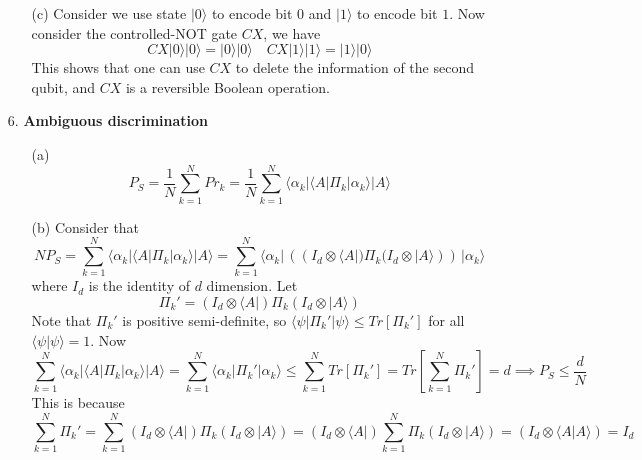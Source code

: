 \begin{enumerate}
\begin{enumerate}
    \item [(c)] Consider we use state $|0\rangle$ to encode bit $0$ and $|1\rangle$ to encode bit $1$. Now consider the controlled-NOT gate $CX$, we have
    \[
    CX |0\rangle |0\rangle = |0\rangle |0\rangle \quad CX |1\rangle |1\rangle = |1\rangle |0\rangle
    \]
    This shows that one can use $CX$ to delete the information of the second qubit, and $CX$ is a reversible Boolean operation.
\end{enumerate}


\item[6.] \textbf{Ambiguous discrimination}

\begin{enumerate}
    \item [(a)]
    \[
    P_S = \frac{1}{N} \sum_{k=1}^N Pr_k = \frac{1}{N} \sum_{k=1}^N \langle \alpha_k | \langle A | \Pi_k | \alpha_k \rangle | A \rangle
    \]

    \item [(b)]
    Consider that
    \[
    NP_S = \sum_{k=1}^N \langle \alpha_k | \langle A | \Pi_k | \alpha_k \rangle | A \rangle =  \sum_{k=1}^N \langle \alpha_k| \, ( (I_d \otimes \langle A|) \Pi_k (I_d \otimes |A\rangle) )\, |\alpha_k \rangle
    \]
    where $I_d$ is the identity of $d$ dimension. Let
    \[
    \Pi_k' = (I_d \otimes \langle A|) \Pi_k (I_d \otimes |A\rangle)
    \]
    Note that $\Pi_k'$ is positive semi-definite, so $\langle \psi | \Pi_k' |\psi \rangle \leq Tr[\Pi_k']$ for all $\langle \psi | \psi \rangle = 1$. Now
    \[
    \sum_{k=1}^N \langle \alpha_k | \langle A | \Pi_k | \alpha_k \rangle | A \rangle = \sum_{k=1}^N \langle \alpha_k | \Pi_k' |\alpha_k \rangle \leq \sum_{k=1}^N Tr[\Pi_k'] = Tr[\sum_{k=1}^N \Pi_k'] = d \implies P_S \leq \frac{d}{N}
    \]
    This is because
    \[
    \sum_{k=1}^N \Pi_k' = \sum_{k=1}^N (I_d \otimes \langle A|) \Pi_k (I_d \otimes |A\rangle) = (I_d \otimes \langle A|) \sum_{k=1}^N \Pi_k (I_d \otimes |A\rangle) = (I_d \otimes \langle A| A \rangle) = I_d
    \]
    

\end{enumerate}
\end{enumerate}
